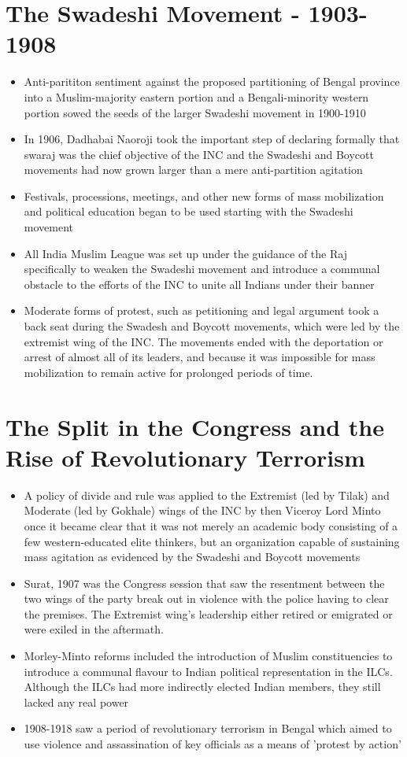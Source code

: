\section{The Swadeshi Movement - 1903-1908}
\begin{itemize}
    \item Anti-parititon sentiment against the proposed partitioning of Bengal province into a Muslim-majority eastern portion and a Bengali-minority western portion sowed the seeds of the larger Swadeshi movement in 1900-1910
    \item In 1906, Dadhabai Naoroji took the important step of declaring formally that \Gls{swaraj} was the chief objective of the INC and the Swadeshi and Boycott movements had now grown larger than a mere anti-partition agitation
    \item Festivals, processions, meetings, and other new forms of mass mobilization and political education began to be used starting with the Swadeshi movement
    \item All India Muslim League was set up under the guidance of the Raj specifically to weaken the Swadeshi movement and introduce a communal obstacle to the efforts of the INC to unite all Indians under their banner
    \item Moderate forms of protest, such as petitioning and legal argument took a back seat during the Swadesh and Boycott movements, which were led by the extremist wing of the INC. The movements ended with the deportation or arrest of almost all of its leaders, and because it was impossible for mass mobilization to remain active for prolonged periods of time.
\end{itemize}

\section{The Split in the Congress and the Rise of Revolutionary Terrorism}
\begin{itemize}
    \item A policy of divide and rule was applied to the Extremist (led by Tilak) and Moderate (led by Gokhale) wings of the INC by then Viceroy Lord Minto once it became clear that it was not merely an academic body consisting of a few western-educated elite thinkers, but an organization capable of sustaining mass agitation as evidenced by the Swadeshi and Boycott movements
    \item Surat, 1907 was the Congress session that saw the resentment between the two wings of the party break out in violence with the police having to clear the premises. The Extremist wing's leadership either retired or emigrated or were exiled in the aftermath.
    \item Morley-Minto reforms included the introduction of Muslim constituencies to introduce a communal flavour to Indian political representation in the ILCs. Although the ILCs had more indirectly elected Indian members, they still lacked any real power
    \item 1908-1918 saw a period of revolutionary terrorism in Bengal which aimed to use violence and assassination of key officials as a means of 'protest by action'
\end{itemize}

